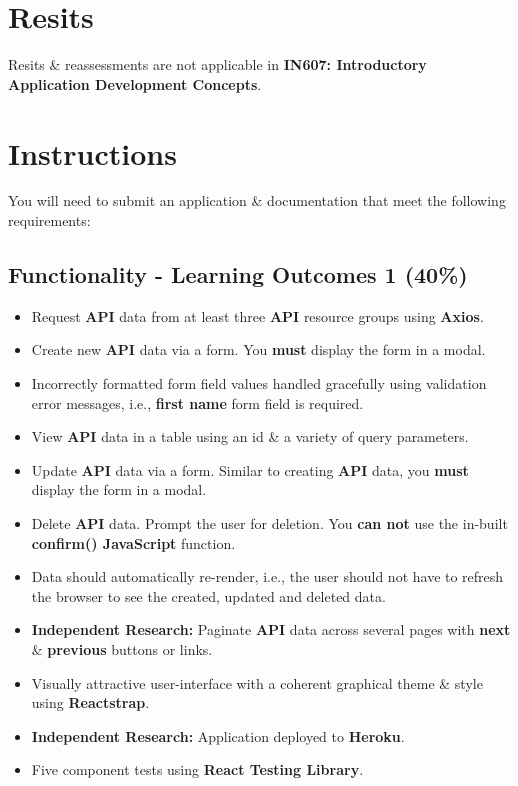 \documentclass{article}
\begin{document}
\section*{Resits}
Resits \& reassessments are not applicable in \textbf{IN607: Introductory Application Development Concepts}. 

\newpage

\section*{Instructions}
You will need to submit an application \& documentation that meet the following requirements:

\subsection*{Functionality - Learning Outcomes 1 (40\%)}

\begin{itemize}
		\item Request \textbf{API} data from at least three \textbf{API} resource groups using \textbf{Axios}.
		\item Create new \textbf{API} data via a form. You \textbf{must} display the form in a modal. 
		\item Incorrectly formatted form field values handled gracefully using validation error messages, i.e., \textbf{first name} form field is required.
		\item View \textbf{API} data in a table using an id \& a variety of query parameters. 
		\item Update \textbf{API} data via a form. Similar to creating \textbf{API} data, you \textbf{must} display the form in a modal. 
		\item Delete \textbf{API} data. Prompt the user for deletion. You \textbf{can not} use the in-built \textbf{confirm() JavaScript} function. 
    \item Data should automatically re-render, i.e., the user should not have to refresh the browser to see the created, updated and deleted data.
    \item \textbf{Independent Research:} Paginate \textbf{API} data across several pages with \textbf{next} \& \textbf{previous} buttons or links.
		\item Visually attractive user-interface with a coherent graphical theme \& style using \textbf{Reactstrap}.
	  \item \textbf{Independent Research:} Application deployed to \textbf{Heroku}. 
	  \item Five component tests using \textbf{React Testing Library}.
\end{itemize}
\end{document}
